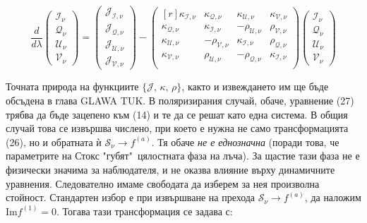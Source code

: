 \begin{equation}
	\frac{d}{d\lambda} \begin{pmatrix}
							\mathcal{I}_\nu\\
							\mathcal{Q}_\nu\\
							\mathcal{U}_\nu\\
							\mathcal{V}_\nu
					     \end{pmatrix} = 
					     \begin{pmatrix}
					     	\mathcal{J}_\mathcal{I,\nu}\\
					     	\mathcal{J}_\mathcal{Q,\nu}\\
					     	\mathcal{J}_\mathcal{U,\nu}\\
					     	\mathcal{J}_\mathcal{V,\nu}
					     \end{pmatrix}
					     -	\begin{pmatrix*}[r]
					     	\kappa_\mathcal{I,\nu} & \kappa_\mathcal{Q,\nu} & \kappa_\mathcal{U,\nu} & \kappa_\mathcal{V,\nu}\\
					        \kappa_\mathcal{Q,\nu}& \kappa_\mathcal{I,\nu}& -\rho_\mathcal{U,\nu}& \rho_\mathcal{V,\nu}\\     	
					     	\kappa_\mathcal{U,\nu}& -\rho_\mathcal{V,\nu}& \kappa_\mathcal{I,\nu}& \rho_\mathcal{Q,\nu}\\	  
					     	 \kappa_\mathcal{V,\nu}& \rho_\mathcal{U,\nu}& -\rho_\mathcal{Q,\nu}& \kappa_\mathcal{I,\nu}\\
					     	\end{pmatrix*}
					     	\begin{pmatrix}
					     		\mathcal{I}_\nu\\
					     		\mathcal{Q}_\nu\\
					     		\mathcal{U}_\nu\\
					     		\mathcal{V}_\nu
					     	\end{pmatrix}
\end{equation}

Точната природа на функциите $\{\mathcal{J},\,\mathcal{\kappa},\,\mathcal{\rho}\}$, както и извеждането им ще бъде обсъдена в глава {\color{red} GLAWA TUK}. В поляризирания случай, обаче, уравнение (27) трябва да бъде зацепено към (14) и те да се решат като една система. В общия случай това се извършва числено, при което е нужна не само трансформацията (26), но и обратната ѝ $\mathcal{S}_\nu\rightarrow f^{(a)}$. Тя обаче \emph{не е еднозначна} (поради това, че параметрите на Стокс "губят"$\,$ цялостната фаза на лъча). За щастие тази фаза не е физически значима за наблюдателя, и не оказва влияние върху динамичните уравнения. Следователно имаме свободата да изберем за нея произволна стойност. Стандартен избор е при извършване на прехода $\mathcal{S}_\nu\rightarrow f^{(a)}$, да наложим $\text{Im}{f^{(1)}} = 0$. Тогава тази трансформация се задава с:


